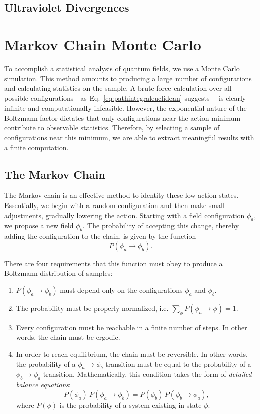 \documentclass[12pt]{report}
\begin{document}
\subsection{Ultraviolet Divergences}

\section{Markov Chain Monte Carlo}

To accomplish a statistical analysis of quantum fields, we use a Monte Carlo simulation. This method amounts to producing a large number of configurations and calculating statistics on the sample. A brute-force calculation over all possible configurations---as Eq.~\ref{eq:pathintegraleuclidean} suggests--- is clearly infinite and computationally infeasible. However, the exponential nature of the Boltzmann factor dictates that only configurations near the action minimum contribute to observable statistics. Therefore, by selecting a sample of configurations near this minimum, we are able to extract meaningful results with a finite computation.

\subsection{The Markov Chain}
The Markov chain is an effective method to identity these low-action states. Essentially, we begin with a random configuration and then make small adjustments, gradually lowering the action. Starting with a field configuration $\phi_a$, we propose a new field $\phi_b$. The probability of accepting this change, thereby adding the configuration to the chain, is given by the function 
\[P(\phi_a \rightarrow \phi_b).\]

There are four requirements that this function must obey to produce a Boltzmann distribution of samples:
\begin{enumerate}
    \item $P(\phi_a \rightarrow \phi_b)$ must depend only on the configurations $\phi_a$ and $\phi_b$.
    \item The probability must be properly normalized, i.e. $\sum_{\phi} P(\phi_a \rightarrow \phi) = 1$.
    \item Every configuration must be reachable in a finite number of steps. In other words, the chain must be ergodic.
    \item In order to reach equilibrium, the chain must be reversible. In other words, the probability of a $\phi_a\rightarrow\phi_b$ transition must be equal to the probability of a $\phi_b\rightarrow\phi_a$ transition. Mathematically, this condition takes the form of \textit{detailed balance equations}:
\begin{equation}
    \label{eq:detailedbalance}
    P(\phi_a)\,P(\phi_a\rightarrow\phi_b) = P(\phi_b)\,P(\phi_b\rightarrow\phi_a),
\end{equation}
where $P(\phi)$ is the probability of a system existing in state $\phi$.
\end{enumerate}
\end{document}

